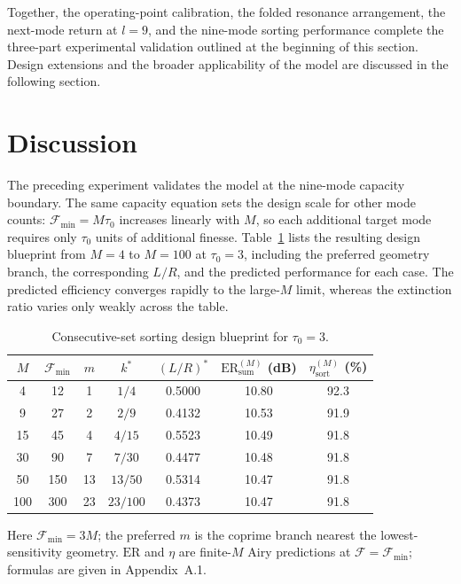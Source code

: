 \documentclass{optica-article}
\begin{document}
Together, the operating-point calibration, the folded resonance arrangement, the next-mode return at $l=9$, and the nine-mode sorting performance complete the three-part experimental validation outlined at the beginning of this section. Design extensions and the broader applicability of the model are discussed in the following section.
\section{Discussion}

The preceding experiment validates the model at the nine-mode capacity boundary. The same capacity equation sets the design scale for other mode counts: $\mathcal{F}_{\min}=M\tau_0$ increases linearly with $M$, so each additional target mode requires only $\tau_0$ units of additional finesse. Table~\ref{tab:oe_design_blueprint} lists the resulting design blueprint from $M=4$ to $M=100$ at $\tau_0=3$, including the preferred geometry branch, the corresponding $L/R$, and the predicted performance for each case. The predicted efficiency converges rapidly to the large-$M$ limit, whereas the extinction ratio varies only weakly across the table.

\begin{table}[htbp]
\centering
\caption{Consecutive-set sorting design blueprint for $\tau_0=3$.}
\label{tab:oe_design_blueprint}
\begin{tabular}{ccccccc}
\hline
$M$ & $\mathcal{F}_{\min}$ & $m$ & $k^*$ & $(L/R)^*$ & $\mathrm{ER}_{\mathrm{sum}}^{(M)}$ (dB) & $\eta_{\mathrm{sort}}^{(M)}$ (\%) \\
\hline
4 & 12 & 1 & $1/4$ & 0.5000 & 10.80 & 92.3 \\
9 & 27 & 2 & $2/9$ & 0.4132 & 10.53 & 91.9 \\
15 & 45 & 4 & $4/15$ & 0.5523 & 10.49 & 91.8 \\
30 & 90 & 7 & $7/30$ & 0.4477 & 10.48 & 91.8 \\
50 & 150 & 13 & $13/50$ & 0.5314 & 10.47 & 91.8 \\
100 & 300 & 23 & $23/100$ & 0.4373 & 10.47 & 91.8 \\
\hline
\end{tabular}

\smallskip
\begin{minipage}{4.25in}
\footnotesize
\setlength{\parindent}{0pt}
Here $\mathcal{F}_{\min}=3M$; the preferred $m$ is the coprime branch nearest the lowest-sensitivity geometry. $\mathrm{ER}$ and $\eta$ are finite-$M$ Airy predictions at $\mathcal{F}=\mathcal{F}_{\min}$; formulas are given in Appendix~A.1.
\end{minipage}
\end{table}
\end{document}
